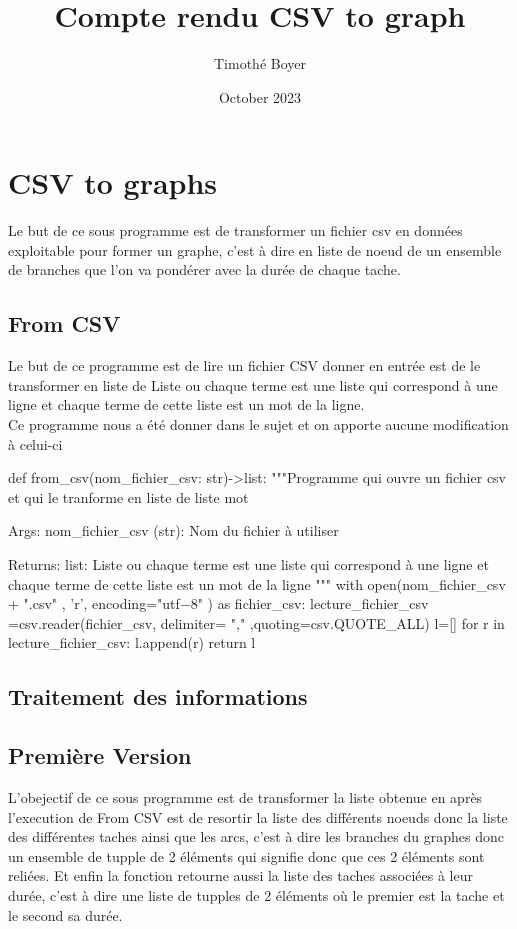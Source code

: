 \documentclass{article}
\title{Compte rendu CSV to graph}
\author{Timothé Boyer}
\date{October 2023}
\begin{document}
\maketitle

\section{CSV to graphs}
Le but de ce sous programme est de transformer un fichier csv en données exploitable pour former un graphe, c'est à dire en liste de noeud de un ensemble de branches que l'on va pondérer avec la durée de chaque tache.

\subsection{From CSV}
Le but de ce programme est de lire un fichier CSV donner en entrée est de le transformer en liste de Liste ou chaque terme est une liste qui correspond à une ligne et chaque terme de cette liste est un mot de la ligne.
\\
Ce programme nous a été donner dans le sujet et on apporte aucune modification à celui-ci 
\begin{python}
def from_csv(nom_fichier_csv: str)->list:
    """Programme qui ouvre un fichier csv et qui le tranforme en liste de liste mot

    Args:
        nom_fichier_csv (str): Nom du fichier à utiliser

    Returns:
        list: Liste ou chaque terme est une liste qui correspond à une ligne et chaque terme de cette liste est un mot de la ligne
    """
    with open(nom_fichier_csv + ".csv" , 'r', encoding="utf−8" ) as fichier_csv:
        lecture_fichier_csv =csv.reader(fichier_csv, delimiter= "," ,quoting=csv.QUOTE_ALL)
        l=[]
        for r in lecture_fichier_csv:
            l.append(r)
        return l
\end{python}

\subsection{Traitement des informations}
\subsection{Première Version}
L'obejectif de ce sous programme est de transformer la liste obtenue en après l'execution de From CSV est de resortir la liste des différents noeuds donc la liste des différentes taches ainsi que les arcs, c'est à dire les branches du graphes donc un ensemble de tupple de 2 éléments qui signifie donc que ces 2 éléments sont reliées. Et enfin la fonction retourne aussi la liste des taches associées à leur durée, c'est à dire une liste de tupples de 2 éléments où le premier est la tache et le second sa durée.
\end{document}
